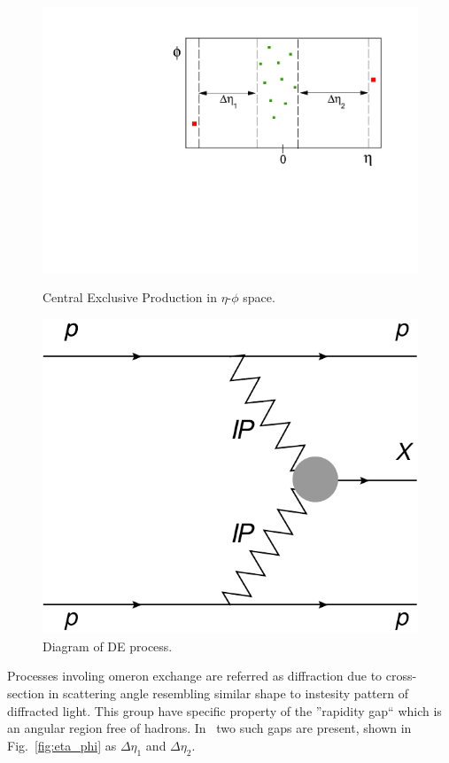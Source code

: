 \begin{figure}
\centering
\parbox{0.475\textwidth}{%
  \centering%
  \hspace*{-10pt}\vspace*{-10pt}\includegraphics[width=1.1\linewidth]{graphics/introduction/eta_phi.pdf}%
  \caption{Central Exclusive Production in $\eta$-$\phi$ space.\\}%
  \label{fig:eta_phi}%
}
\quad
\parbox{0.475\textwidth}{%
  \centering%
  \vspace*{-10pt}\includegraphics[width=0.64\linewidth]{graphics/introduction/DPE.pdf}%
  \caption{Diagram of D\Pom E process.\\}%
  \label{fig:DPE}%
}
\end{figure}

Processes involing \Pom omeron exchange are referred as diffraction due to cross-section in scattering angle resembling similar shape to instesity pattern of diffracted light. This group have specific property of the ''rapidity gap`` which is an angular region free of hadrons. In \DPE\ two such gaps are present, shown in Fig.~\ref{fig:eta_phi} as $\Delta\eta_{1}$ and $\Delta\eta_{2}$.

